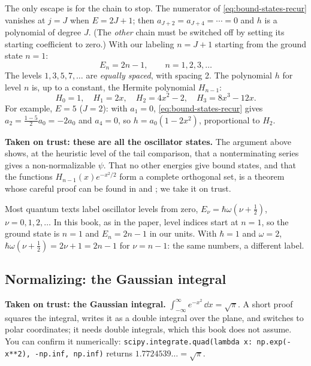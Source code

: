 The only escape is for the chain to stop. The numerator of \cref{eq:bound-states-recur} vanishes at $j=J$ when $E=2J+1$; then $a_{J+2}=a_{J+4}=\cdots=0$ and $h$ is a polynomial of degree $J$. (The \emph{other} chain must be switched off by setting its starting coefficient to zero.) With our labeling $n=J+1$ starting from the ground state $n=1$:
\begin{equation}
E_n=2n-1,\qquad n=1,2,3,\dots
\label{eq:bound-states-shoE}
\end{equation}
The levels $1,3,5,7,\dots$ are \emph{equally spaced}, with spacing 2. The polynomial $h$ for level $n$ is, up to a constant, the Hermite polynomial $H_{n-1}$:
\[
H_0=1,\quad H_1=2x,\quad H_2=4x^2-2,\quad H_3=8x^3-12x .
\]
For example, $E=5$ ($J=2$): with $a_1=0$, \cref{eq:bound-states-recur} gives $a_2=\frac{1-5}{2}a_0=-2a_0$ and $a_4=0$, so $h=a_0(1-2x^2)$, proportional to $H_2$.

\begin{beyond}
\textbf{Taken on trust: these are all the oscillator states.} The argument above shows, at the heuristic level of the tail comparison, that a nonterminating series gives a non-normalizable $\psi$. That no other energies give bound states, and that the functions $H_{n-1}(x)e^{-x^2/2}$ form a complete orthogonal set, is a theorem whose careful proof can be found in \cite{griffiths} and \cite{rhb}; we take it on trust.
\end{beyond}

\begin{pitfall}
Most quantum texts label oscillator levels from zero, $E_\nu=\hbar\omega(\nu+\tfrac12)$, $\nu=0,1,2,\dots$ In this book, as in the paper, level indices start at $n=1$, so the ground state is $n=1$ and $E_n=2n-1$ in our units. With $\hbar=1$ and $\omega=2$, $\hbar\omega(\nu+\tfrac12)=2\nu+1=2n-1$ for $\nu=n-1$: the same numbers, a different label.
\end{pitfall}

\subsection{Normalizing: the Gaussian integral}

\begin{beyond}
\textbf{Taken on trust: the Gaussian integral.} $\displaystyle\int_{-\infty}^{\infty}e^{-x^2}\,\dd x=\sqrt\pi$. A short proof squares the integral, writes it as a double integral over the plane, and switches to polar coordinates; it needs double integrals, which this book does not assume. You can confirm it numerically: \texttt{scipy.integrate.quad(lambda x: np.exp(-x**2), -np.inf, np.inf)} returns $1.7724539\ldots=\sqrt\pi$.
\end{beyond}

